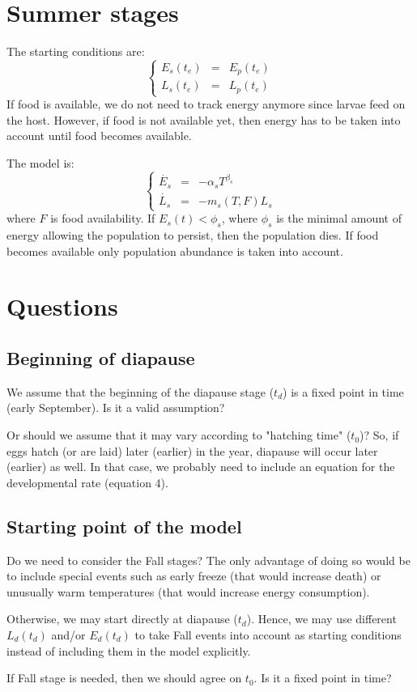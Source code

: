 \documentclass[12 pt]{article}
\begin{document}
\section{Summer stages}
The starting conditions are:
\begin{equation}
    \left \lbrace
       \begin{array}{lcl}
           E_s(t_e) & = & E_p(t_e) \\
           L_s(t_e) & = & L_p(t_e)
        \end{array} \right .    
\end{equation}
If food is available, we do not need to track energy anymore since larvae feed on the host. However, if food is not available yet, then energy has to be taken into account until food becomes available. \par
The model is:
\begin{equation}
    \left \lbrace
       \begin{array}{lcl}
           \Dot{E_s} & = & - \alpha _s T^{\beta _s} \\
           \dot{L_s} & = & - m_s(T,F) L_s
       \end{array} \right .
\end{equation}
where $F$ is food availability. If $E_s(t)<\phi _s$, where $\phi _s$ is the minimal amount of energy allowing the population to persist, then the population dies. If food becomes available only population abundance is taken into account.

\section{Questions}
\subsection{Beginning of diapause}
We assume that the beginning of the diapause stage ($t_d$) is a fixed point in time (early September). Is it a valid assumption? \par
Or should we assume that it may vary according to "hatching time" ($t_0$)? So, if eggs hatch (or are laid) later (earlier) in the year, diapause will occur later (earlier) as well. In that case, we probably need to include an equation for the developmental rate (equation 4). 
\subsection{Starting point of the model}
Do we need to consider the Fall stages? The only advantage of doing so would be to include special events such as early freeze (that would increase death) or unusually warm temperatures (that would increase energy consumption). \par
Otherwise, we may start directly at diapause ($t_d$). Hence, we may use different $L_d(t_d)$ and/or $E_d (t_d)$ to take Fall events into account as starting conditions instead of including them in the model explicitly. \par
If Fall stage is needed, then we should agree on $t_0$. Is it a fixed point in time?
\end{document}
